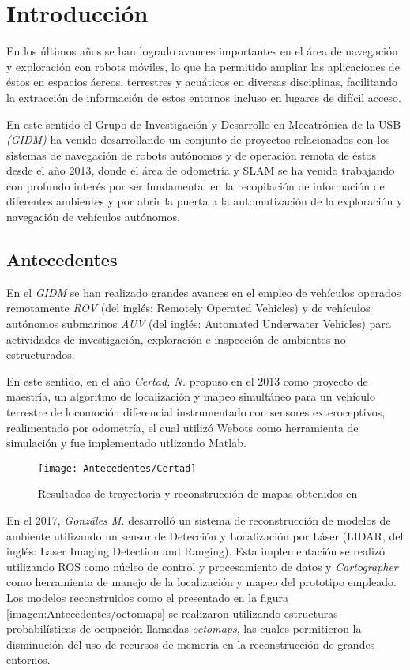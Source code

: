 \chapter{Introducción}
\label{capitulo1}

En los últimos años se han logrado avances importantes en el área de navegación y exploración con robots móviles, lo que ha permitido ampliar las aplicaciones de éstos en espacios áereos, terrestres y acuáticos en diversas disciplinas, facilitando la extracción de información de estos entornos incluso en lugares de difícil acceso.

En este sentido el Grupo de Investigación y Desarrollo en Mecatrónica de la USB \textit{(GIDM)} ha venido desarrollando un conjunto de proyectos relacionados con los sistemas de navegación de robots autónomos y de operación remota de éstos desde el año 2013, donde el área de odometría y SLAM se ha venido trabajando con profundo interés por ser fundamental en la recopilación de información de diferentes ambientes y por abrir la puerta a la automatización de la exploración y navegación de vehículos autónomos.

\section{Antecedentes}

En el \textit{GIDM} se han realizado grandes avances en el empleo de vehículos operados remotamente \textit{ROV} (del inglés: Remotely Operated Vehicles) y de vehículos autónomos submarinos \textit{AUV} (del inglés: Automated Underwater Vehicles) para actividades de investigación, exploración e inspección de ambientes no estructurados.

En este sentido, en el año \textit{Certad, N.} \cite{novel} propuso en el 2013 como proyecto de maestría, un algoritmo de localización y mapeo simultáneo para un vehículo terrestre de locomoción diferencial instrumentado con sensores exteroceptivos, realimentado por odometría, el cual utilizó Webots como herramienta de simulación y fue implementado utlizando Matlab.


\begin{figure}[H]
	\centering
	\texttt{[image: Antecedentes/Certad]}
	\caption{Resultados de trayectoria y reconstrucción de mapas obtenidos en \cite{novel}}
	\label{imagen:Antecedentes/Certad}
\end{figure}

En el 2017, \textit{Gonzáles M.} \cite{manuel} desarrolló un sistema de reconstrucción de modelos de ambiente utilizando un sensor de Detección y Localización por Láser (LIDAR, del inglés: Laser Imaging Detection and Ranging). Esta implementación se realizó utilizando ROS como núcleo de control y procesamiento de datos y \textit{Cartographer} como herramienta de manejo de la localización y mapeo del prototipo empleado. Los modelos reconstruidos como el presentado en la figura \ref{imagen:Antecedentes/octomaps} se realizaron utilizando estructuras probabilísticas de ocupación llamadas \textit{octomaps}, las cuales permitieron la disminución del uso de recursos de memoria en la reconstrucción de grandes entornos.



